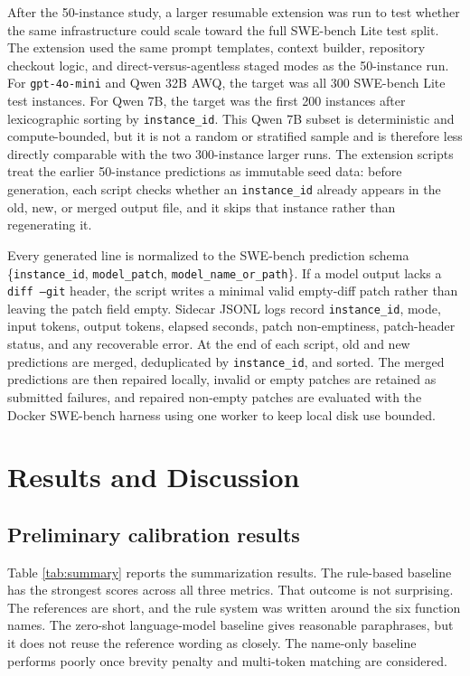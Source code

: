 \documentclass[preprint,12pt]{elsarticle}
\begin{document}
After the 50-instance study, a larger resumable extension was run to test whether the same infrastructure could scale toward the full SWE-bench Lite test split. The extension used the same prompt templates, context builder, repository checkout logic, and direct-versus-agentless staged modes as the 50-instance run. For \texttt{gpt-4o-mini} and Qwen 32B AWQ, the target was all 300 SWE-bench Lite test instances. For Qwen 7B, the target was the first 200 instances after lexicographic sorting by \texttt{instance\_id}. This Qwen 7B subset is deterministic and compute-bounded, but it is not a random or stratified sample and is therefore less directly comparable with the two 300-instance larger runs. The extension scripts treat the earlier 50-instance predictions as immutable seed data: before generation, each script checks whether an \texttt{instance\_id} already appears in the old, new, or merged output file, and it skips that instance rather than regenerating it.

Every generated line is normalized to the SWE-bench prediction schema \{\texttt{instance\_id}, \texttt{model\_patch}, \texttt{model\_name\_or\_path}\}. If a model output lacks a \texttt{diff --git} header, the script writes a minimal valid empty-diff patch rather than leaving the patch field empty. Sidecar JSONL logs record \texttt{instance\_id}, mode, input tokens, output tokens, elapsed seconds, patch non-emptiness, patch-header status, and any recoverable error. At the end of each script, old and new predictions are merged, deduplicated by \texttt{instance\_id}, and sorted. The merged predictions are then repaired locally, invalid or empty patches are retained as submitted failures, and repaired non-empty patches are evaluated with the Docker SWE-bench harness using one worker to keep local disk use bounded.

\section{Results and Discussion}

\subsection{Preliminary calibration results}

Table \ref{tab:summary} reports the summarization results. The rule-based baseline has the strongest scores across all three metrics. That outcome is not surprising. The references are short, and the rule system was written around the six function names. The zero-shot language-model baseline gives reasonable paraphrases, but it does not reuse the reference wording as closely. The name-only baseline performs poorly once brevity penalty and multi-token matching are considered.
\end{document}
